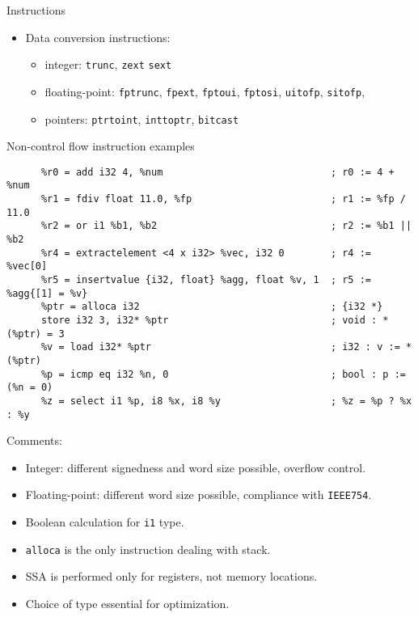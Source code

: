 \documentclass[8pt]{beamer}
\begin{document}
\begin{frame}[fragile]{Instructions}
\begin{block}{}
\begin{itemize}
      \item Data conversion instructions:
        \begin{itemize}
          \item integer: \verb+trunc+, \verb+zext+ \verb+sext+
          \item floating-point: \verb+fptrunc+, \verb+fpext+, \verb+fptoui+,
            \verb+fptosi+, \verb+uitofp+, \verb+sitofp+,
          \item pointers: \verb+ptrtoint+, \verb+inttoptr+, \verb+bitcast+
        \end{itemize}
    \end{itemize}
  \end{block}
\end{frame}

\begin{frame}[fragile]{Non-control flow instruction examples}
  \begin{exampleblock}{}
    \begin{verbatim}
      %r0 = add i32 4, %num                             ; r0 := 4 + %num
      %r1 = fdiv float 11.0, %fp                        ; r1 := %fp / 11.0
      %r2 = or i1 %b1, %b2                              ; r2 := %b1 || %b2
      %r4 = extractelement <4 x i32> %vec, i32 0        ; r4 := %vec[0]
      %r5 = insertvalue {i32, float} %agg, float %v, 1  ; r5 := %agg{[1] = %v}
      %ptr = alloca i32                                 ; {i32 *}
      store i32 3, i32* %ptr                            ; void : *(%ptr) = 3
      %v = load i32* %ptr                               ; i32 : v := *(%ptr)
      %p = icmp eq i32 %n, 0                            ; bool : p := (%n = 0)
      %z = select i1 %p, i8 %x, i8 %y                   ; %z = %p ? %x : %y
    \end{verbatim}
  \end{exampleblock}

  \begin{block}{Comments:}
    \begin{itemize}
      \item Integer: different signedness and word size possible, overflow
        control.
      \item Floating-point: different word size possible, compliance with
        \verb+IEEE754+.
      \item Boolean calculation for \verb+i1+ type.
      \item \verb+alloca+ is the only instruction dealing with stack.
      \item SSA is performed only for registers, not memory locations.
      \item Choice of type essential for optimization.
    \end{itemize}
  \end{block}
\end{frame}
\end{document}
